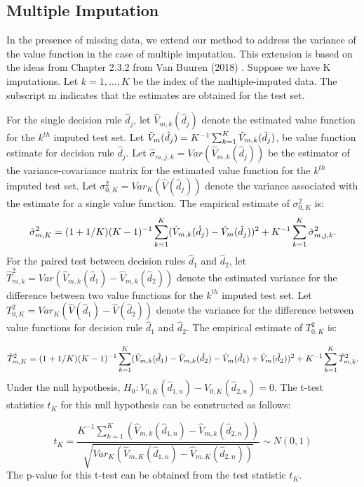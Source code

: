\documentclass{article}
\begin{document}
\subsection{Multiple Imputation}
In the presence of missing data, we extend our method to address the variance of the value function in the case of multiple imputation. This extension is based on the ideas from Chapter 2.3.2 from Van Buuren (2018) \cite{van2018flexible}.
Suppose we have K imputations. Let $k=1,\dots,K$ be the index of the multiple-imputed data. The subscript m indicates that the estimates are obtained for the test set.

For the single decision rule $\hat{d}_{j}$, let $\hat{V}_{m,k}(\hat{d}_{j})$ denote the estimated value function for the $k^{th}$ imputed test set. Let $\Tilde{V}_{m}(\hat{d}_j)=K^{-1}\sum_{k=1}^K\hat{V}_{m,k}(\hat{d}_j)$, be value function estimate for decision rule $\hat{d}_j$. Let $\hat{\sigma}_{m,j,k}=Var(\hat{V}_{m,k}(\hat{d}_{j}))$ be the estimator of the variance-covariance matrix for the estimated value function for the $k^{th}$ imputed test set.  Let $\sigma_{0,K}^2 = Var_K(\hat{V}(\hat{d}_j))$ denote the variance associated with the estimate for a single value function. The empirical estimate of $\sigma_{0,K}^2$ is:
\begin{equation}
    \hat{\sigma}_{m,K}^2 = (1+1/K)(K-1)^{-1}\sum_{k=1}^K(\hat{V}_{m,k}(\hat{d}_j)-\Tilde{V}_m(\hat{d}_j))^2+K^{-1}\sum_{k=1}^K \hat{\sigma}^2_{m,j,k}.
\end{equation}
For the paired test between decision rules $\hat{d}_{1}$ and $\hat{d}_{2}$, let $\hat{T}^2_{m,k}=Var(\hat{V}_{m,k}(\hat{d}_{1})-\hat{V}_{m,k}(\hat{d}_{2}))$ denote the estimated variance for the difference between two value functions for the $k^{th}$ imputed test set. Let $T_{0,K}^2 = Var_K(\hat{V}(\hat{d}_1)-\hat{V}(\hat{d}_2))$ denote the variance for the difference between value functions for decision rule $\hat{d}_1$ and $\hat{d}_2$. The empirical estimate of $T_{0,K}^2$ is:

\begin{equation}\label{eq:estvardiffmi}
    \hat{T}_{m,K}^2 = (1+1/K)(K-1)^{-1}\sum_{k=1}^{K}(\hat{V}_{m,k}(\hat{d}_1)-\hat{V}_{m,k}(\hat{d}_2)-\Tilde{V}_{m}(\hat{d}_1)+\Tilde{V}_{m}(\hat{d}_2))^2+K^{-1}\sum_{k=1}^{K}\hat{T}^2_{m,k}.
\end{equation}
Under the null hypothesis, $H_0:V_{0,K}(\hat{d}_{1,n})-V_{0,K}(\hat{d}_{2,n})=0$. The t-test statistics $t_K$ for this null hypothesis can be constructed as follows:

\begin{equation}\label{eq:ttestmi}
t_K = \frac{K^{-1}\sum_{k=1}^K(\hat{V}_{m,k}(\hat{d}_{1,n})-\hat{V}_{m,k}(\hat{d}_{2,n}))}{\sqrt{Var_K(\hat{V}_{m,K}(\hat{d}_{1,n})-\hat{V}_{m,K}(\hat{d}_{2,n}))}} \sim N(0,1)
\end{equation}
The p-value for this t-test can be obtained from the test statistic $t_K$.
\end{document}
